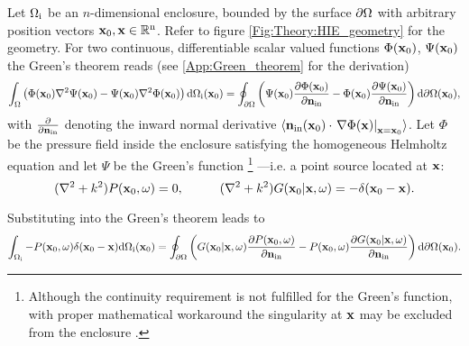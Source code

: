 Let $\Omega_{\mathrm{i}}$ be an $n$-dimensional enclosure, bounded by the surface $\partial \Omega$ with arbitrary position vectors $\mathbf{x}_0, \mathbf{x} \in \mathbb{R}^{\mathrm{n}}$. 
Refer to figure \ref{Fig:Theory:HIE_geometry} for the geometry. 
For two continuous, differentiable scalar valued functions $\Phi(\mathbf{x}_0)$, $\Psi(\mathbf{x}_0)$ the Green's theorem reads (see \ref{App:Green_theorem} for the derivation)
\begin{equation}
\small
\int_{\Omega}
\left(  \Phi(\mathbf{x}_0) \nabla^2 \Psi(\mathbf{x}_0) - \Psi(\mathbf{x}_0) \nabla^2 \Phi(\mathbf{x}_0)   \right)   \mathrm{d} \Omega_{\mathrm{i}}(\mathbf{x}_0)= 
\oint_{\partial \Omega}  \left(  \Psi(\mathbf{x}_0) \frac{\partial \Phi(\mathbf{x}_0)}{\partial \mathbf{n}_{\mathrm{in}}}  - \Phi(\mathbf{x}_0) \frac{\partial \Psi(\mathbf{x}_0)}{\partial \mathbf{n}_{\mathrm{in}}}  \right)   \mathrm{d} \partial \Omega(\mathbf{x}_0),
\label{Eq:Theory:Greens-theorem}
\end{equation}
with $\frac{\partial}{\partial \mathbf{n}_{\mathrm{in}}}$ denoting the inward normal derivative $\langle \mathbf{n}_{\mathrm{in}}(\mathbf{x}_0) \cdot \left. \nabla \Phi(\mathbf{x})\right|_{\mathbf{x} = \mathbf{x}_0} \rangle$.
Let $\Phi$ be the pressure field inside the enclosure satisfying the homogeneous Helmholtz equation and let $\Psi$ be the Green's function
\footnote{Although the continuity requirement is not fulfilled for the Green's function, with proper mathematical workaround the singularity at $\mathbf{x}$ may be excluded from the enclosure \cite{Williams1999}.}
---i.e. a point source located at $\mathbf{x}$:
\begin{equation}
(\nabla^2 + k^2)P(\vxo,\omega) = 0, \hspace{10mm}
(\nabla^2 + k^2)G(\vxo|\vx,\omega) = -\delta(\vxo - \vx).
\end{equation}

Substituting into the Green's theorem leads to
\begin{equation}
\small
\int_{\Omega_{\mathrm{i}}} - P(\mathbf{x}_0,\omega) \delta(\mathbf{x}_0 - \mathbf{x})
  \mathrm{d} \Omega_{\mathrm{i}}(\mathbf{x}_0) = 
\oint_{\partial \Omega}  \left(  G(\mathbf{x}_0|\mathbf{x},\omega) \frac{\partial P(\mathbf{x}_0,\omega)}{\partial \mathbf{n}_{\mathrm{in}}}  - P(\mathbf{x}_0,\omega)  \frac{\partial G(\mathbf{x}_0|\mathbf{x},\omega)}{\partial \mathbf{n}_{\mathrm{in}}}  \right)   \mathrm{d} \partial \Omega(\mathbf{x}_0).
\end{equation}

